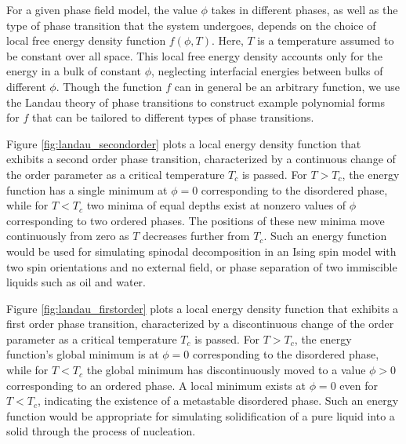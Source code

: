 For a given phase field model, the value $\phi$ takes in different phases, as well as the type of phase transition that the system undergoes, depends on the choice of local free energy density function $f(\phi,T)$. Here, $T$ is a temperature assumed to be constant over all space. This local free energy density accounts only for the energy in a bulk of constant $\phi$, neglecting interfacial energies between bulks of different $\phi$. Though the function $f$ can in general be an arbitrary function, we use the Landau theory of phase transitions to construct example polynomial forms for $f$ that can be tailored to different types of phase transitions.

Figure \ref{fig:landau_secondorder} plots a local energy density function that exhibits a second order phase transition, characterized by a continuous change of the order parameter as a critical temperature $T_c$ is passed. For $T>T_c$, the energy function has a single minimum at $\phi=0$ corresponding to the disordered phase, while for $T<T_c$ two minima of equal depths exist at nonzero values of $\phi$ corresponding to two ordered phases. The positions of these new minima move continuously from zero as $T$ decreases further from $T_c$. Such an energy function would be used for simulating spinodal decomposition in an Ising spin model with two spin orientations and no external field, or phase separation of two immiscible liquids such as oil and water.

Figure \ref{fig:landau_firstorder} plots a local energy density function that exhibits a first order phase transition, characterized by a discontinuous change of the order parameter as a critical temperature $T_c$ is passed. For $T>T_c$, the energy function's global minimum is at $\phi=0$ corresponding to the disordered phase, while for $T<T_c$ the global minimum has discontinuously moved to a value $\phi>0$ corresponding to an ordered phase. A local minimum exists at $\phi=0$ even for $T<T_c$, indicating the existence of a metastable disordered phase. Such an energy function would be appropriate for simulating solidification of a pure liquid into a solid through the process of nucleation.

